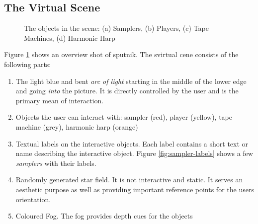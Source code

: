 \documentclass[10pt,a4paper]{scrartcl}
\begin{document}
\subsection{The Virtual Scene}

\begin{figure}[hbtp]
\begin{center}
\caption{The objects in the scene: (a) Samplers, (b) Players, (c) Tape Machines, (d) Harmonic Harp}
\label{fig:screen-shot-overview}
\end{center}
\end{figure}


Figure \ref{fig:screen-shot-overview} shows an overview shot of sputnik. The svirtual cene consists of the following parts:
\begin{enumerate}
\item The light blue and bent \emph{arc of light} starting in the middle of the lower edge and going \emph{into} the picture. It is directly controlled by the user and is the primary mean of interaction.

\item Objects the user can interact with: sampler (red), player (yellow), tape machine (grey), harmonic harp (orange)

\item Textual labels on the interactive objects. Each label contains a short text or name describing the interactive object. Figure \ref{fig:sampler-labels} shows a few \emph{samplers} with their labels.

\item Randomly generated star field. It is not interactive and static. It serves an aesthetic purpose as well as providing important reference points for the users orientation.

\item Coloured Fog. The fog provides depth cues for the objects
\end{enumerate}
\end{document}
